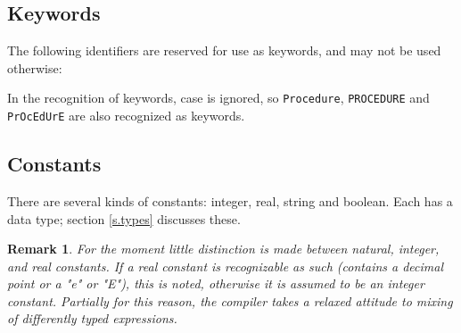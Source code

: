 \documentclass[a4paper]{article}
\newlength{\keywordwidth} %
\newtheorem{remark}{Remark}
\begin{document}
\subsection{Keywords}
The following identifiers are reserved for use as keywords, and may not be
used otherwise: 
\settowidth{\keywordwidth}{\tt redistribute1}
\begin{quote}
\end{quote}
In the recognition of keywords, case is ignored, so
\verb"Procedure", \verb"PROCEDURE" and \verb"PrOcEdUrE" are also
recognized as keywords.
\subsection{Constants}
There are several kinds of constants: integer, real, string and boolean.
Each has a data type; section \ref{s.types} discusses these.
\begin{remark}
For the moment little distinction is made between natural,
integer, and real constants. If a real constant is recognizable
as such (contains a decimal point or a "e" or "E"), this is noted,
otherwise it is assumed to be an integer constant. Partially for
this reason, the compiler
takes a relaxed attitude to mixing of differently typed expressions.
\end{remark}
\end{document}
